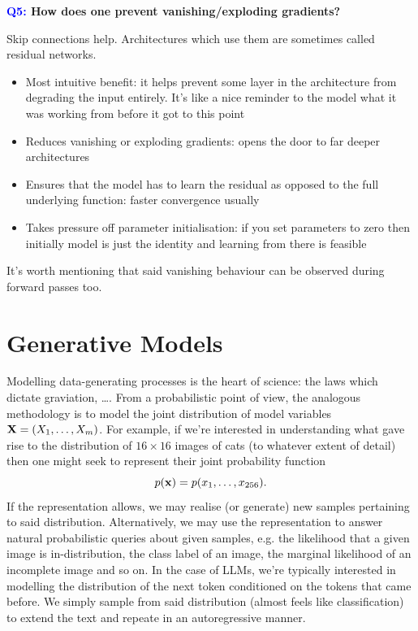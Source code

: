 \documentclass[11pt]{article}
\begin{document}
\begin{center}
    \textbf{\textcolor{blue}{Q5:} How does one prevent vanishing/exploding gradients?}
\end{center}
Skip connections help. Architectures which use them are sometimes called residual networks.
\begin{itemize}
    \item Most intuitive benefit: it helps prevent some layer in the architecture from degrading the input entirely. It's like a nice reminder to the model what it was working from before it got to this point
    \item Reduces vanishing or exploding gradients: opens the door to far deeper architectures
    \item Ensures that the model has to learn the residual as opposed to the full underlying function: faster convergence usually
    \item Takes pressure off parameter initialisation: if you set parameters to zero then initially model is just the identity and learning from there is feasible
\end{itemize}

It's worth mentioning that said vanishing behaviour can be observed during forward passes too.

\section{Generative Models}

Modelling data-generating processes is the heart of science: the laws which dictate graviation, \dots. From a probabilistic point of view, the analogous methodology is to model the joint distribution of model variables $\mathbf{X}=(X_1,\dots,X_m)$. For example, if we're interested in understanding what gave rise to the distribution of $16\times16$ images of cats (to whatever extent of detail) then one might seek to represent their joint probability function
$$
p(\mathbf{x})
=
p(x_1,\dots,x_{256}).
$$
If the representation allows, we may realise (or generate) new samples pertaining to said distribution. Alternatively, we may use the representation to answer natural probabilistic queries about given samples, e.g. the likelihood that a given image is in-distribution, the class label of an image, the marginal likelihood of an incomplete image and so on. In the case of LLMs, we're typically interested in modelling the distribution of the next token conditioned on the tokens that came before. We simply sample from said distribution (almost feels like classification) to extend the text and repeate in an autoregressive manner.
\end{document}
